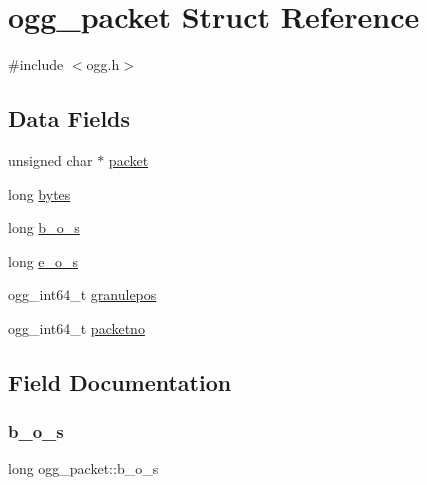 \hypertarget{structogg__packet}{}\section{ogg\+\_\+packet Struct Reference}
\label{structogg__packet}


{\ttfamily \#include $<$ogg.\+h$>$}

\subsection*{Data Fields}
\begin{DoxyCompactItemize}
\item 
unsigned char $\ast$ \hyperlink{structogg__packet_a57e7096985ec8766dce415e248767c32}{packet}
\item 
long \hyperlink{structogg__packet_a4438269ce6025d8817865ae66d5881f1}{bytes}
\item 
long \hyperlink{structogg__packet_adbf12677237d6f5333017de9b59b4ea7}{b\+\_\+o\+\_\+s}
\item 
long \hyperlink{structogg__packet_aa367e7c5425c5f65cbd126b82dfc72e8}{e\+\_\+o\+\_\+s}
\item 
ogg\+\_\+int64\+\_\+t \hyperlink{structogg__packet_a838d9a000e08bae982409bc2734fc566}{granulepos}
\item 
ogg\+\_\+int64\+\_\+t \hyperlink{structogg__packet_a60e257b3a8f843135474457197c65a45}{packetno}
\end{DoxyCompactItemize}


\subsection{Field Documentation}
\mbox{\label{structogg__packet_adbf12677237d6f5333017de9b59b4ea7}} 
\subsubsection{\texorpdfstring{b\+\_\+o\+\_\+s}{b\_o\_s}}
{\footnotesize\ttfamily long ogg\+\_\+packet\+::b\+\_\+o\+\_\+s}

\mbox{\label{structogg__packet_a4438269ce6025d8817865ae66d5881f1}} 
